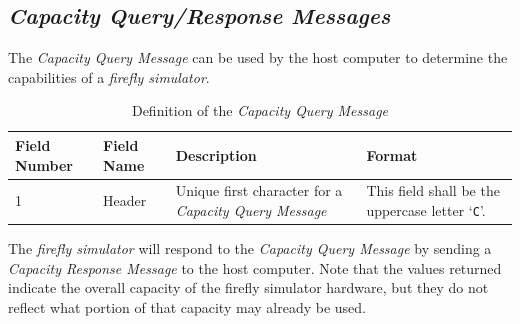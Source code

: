 \documentclass[letterpaper,11pt]{article}
\begin{document}
\subsection{\textit{Capacity Query/Response Messages}}

The \textit{Capacity Query Message} can be used by the host computer to
determine the capabilities of a \textit{firefly simulator}.

\begin{table}[H]
  \caption{Definition of the \textit{Capacity Query Message}}
  \centering
  \setlength\extrarowheight{2pt}
  \begin{tabular}[h]{|p{0.5in}|p{1.00in}|p{2.25in}|p{2.25in}|} \hline
    Field Number & Field Name & Description & Format \\ \hline
    1            & Header
    & Unique first character for a \textit{Capacity Query Message}
    & This field shall be the uppercase letter `\texttt{C}'.
    \\ \hline
  \end{tabular}
  \label{tab:CapacityQuery}
\end{table}

The \textit{firefly simulator} will respond to the \textit{Capacity Query
Message} by sending a \textit{Capacity Response Message} to the host computer.
Note that the values returned indicate the overall capacity of the firefly
simulator hardware, but they do not reflect what portion of that capacity
may already be used.
\end{document}
